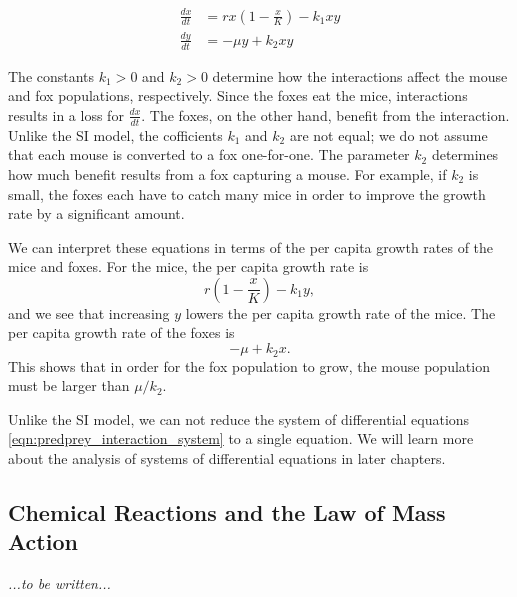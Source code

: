 \documentclass[reqno]{immbook}
\numberwithin{equation}{chapter}
\numberwithin{question}{section}
\numberwithin{theorem}{chapter}
\numberwithin{figure}{chapter}
\theoremstyle{definition}
\begin{document}
\begin{equation}
\begin{split}
   \frac{dx}{dt} & = rx\left(1-\frac{x}{K}\right) - k_1xy \\
   \frac{dy}{dt} & = -\mu y + k_2xy
\end{split}
\label{eqn:predprey_interaction_system}
\end{equation}

The constants $k_1 > 0$ and $k_2 > 0$ determine how the
interactions affect the mouse and fox populations, respectively.
Since the foxes eat the mice, interactions results
in a loss for $\frac{dx}{dt}$.
The foxes, on the other hand, benefit from the interaction.
Unlike the SI model, the cofficients $k_1$ and $k_2$
are not equal; we do not assume that
each mouse is converted to a fox one-for-one.
The parameter $k_2$ determines
how much benefit results from a fox capturing a mouse.
For example, if $k_2$ is small, 
the foxes each have to catch many mice in order to improve
the growth rate by a significant amount.

We can interpret these equations in terms of the
per capita growth rates of the mice and foxes.
For the mice, the per capita growth rate
is
\begin{equation}
      r\left(1-\frac{x}{K}\right)-k_1 y,
\end{equation}
and we see that increasing
$y$ lowers the per capita growth rate of the
mice.
The per capita growth rate of the foxes
is
\begin{equation}
-\mu + k_2 x.
\end{equation}
This shows that in order
for the fox population to grow, the mouse 
population must be larger than $\mu/k_2$.

Unlike the SI model, we can not reduce the system
of differential equations
\eqref{eqn:predprey_interaction_system}
to a single equation.
We will learn more about the analysis of systems
of differential equations in later chapters.

\subsection{Chemical Reactions and the Law of Mass Action}

\emph{...to be written...}

\newpage
\end{document}
